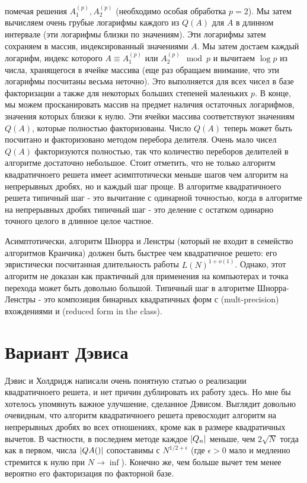\documentclass[russian, utf8, a4paper,12pt]{report}
\DeclarePairedDelimiter\abs{\lvert}{\rvert}%
\begin{document}
помечая решения $A_{1}^{(p)}, A_{2}^{(p)}$ (необходимо особая обработка $p = 2$). Мы затем вычисляем очень грубые логарифмы каждого из $Q(A)$ для $A$ в длинном интервале (эти логарифмы близки по значениям). Эти логарифмы затем сохраняем в массив, индексированный значениями $A$. Мы затем достаем каждый логарифм, индекс которого $A \equiv A_{1}^{(p)}$ или $A_{2}^{(p)} \mod p$ и вычитаем $\log{p}$ из числа, хранящегося в ячейке массива (еще раз обращаем внимание, что эти логарифмы посчитаны весьма неточно). Это выполняется для всех чисел в базе факторизации а также для некоторых больших степеней маленьких $p$. В конце, мы можем просканировать массив на предмет наличия остаточных логарифмов, значения которых близки к нулю. Эти ячейки массива соответствуют значениям $Q(A)$, которые полностью факторизованы. Число $Q(A)$ теперь может быть посчитано и факторизовано методом перебора делителя. Очень мало чисел $Q(A)$ факторизуются полностью, так что количество переборов делителей в алгоритме достаточно небольшое. Стоит отметить, что не только алгоритм квадратичноего решета имеет асимптотически меньше шагов чем алгоритм на непрерывных дробях, но и каждый шаг проще. В алгоритме квадратичноего решета типичный шаг - это вычитание с одинарной точностью, когда в алгоритме на непрерывных дробях типичный шаг - это деление с остатком одинарно точного целого в длинное целое частное.

Асимптотически, алгоритм Шнорра и Ленстры \cite{shnor} (который не входит в семейство алгоритмов Краичика) должен быть быстрее чем квадратичное решето: его эвристически посчитанная длительность работы $L(N)^{1 + o(1)}$. Однако, этот алгоритм не доказан как практичный для применения на компьютерах и точка перехода может быть довольно большой. Типичный шаг в алгоритме Шнорра-Ленстры - это композиция бинарных квадратичных форм с (mult-precision) вхождениями и (reduced form in the class).

\section{Вариант Дэвиса}
Дэвис и Холдридж \cite{sand} написали очень понятную статью о реализации квадратичноего решета, и нет причин дублировать их работу здесь. Но мне бы хотелось упомянуть важное улучшение, сделанное Дэвисом. Выглядит довольно очевидным, что алгоритм квадратичноего решета превосходит алгоритм на непрерывных дробях во всех отношениях, кроме как в размере квадратичных вычетов. В частности, в последнем методе каждое $\abs{Q_n}$ меньше, чем $2\sqrt{N}$ тогда как в первом, числа $\abs{QA()}$ сопоставимы с $N^{1/2 + \epsilon}$ (где $\epsilon > 0$ мало и медленно стремится к нулю при $N \to \inf$). Конечно же, чем больше вычет тем менее вероятно его факторизация по факторной базе.
\end{document}

